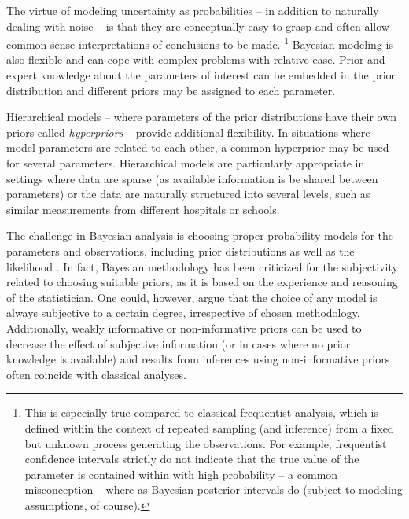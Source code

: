 The virtue of modeling uncertainty as probabilities -- in addition to
naturally dealing with noise -- is that they are conceptually easy to grasp
and often allow common-sense interpretations of conclusions to be made.
\footnote{This is especially true compared to classical frequentist analysis,
which is defined within the context of repeated sampling (and inference) from
a fixed but unknown process generating the observations. For
example, frequentist confidence intervals strictly do not indicate that the
true value of the parameter is contained within with high probability -- a
common misconception -- where as Bayesian posterior intervals do (subject to
modeling assumptions, of course).}
Bayesian modeling is also flexible and can cope with complex problems with
relative ease. Prior and expert knowledge about the parameters of interest can be
embedded in the prior distribution and different priors may be assigned to
each parameter.

Hierarchical models -- where parameters of the prior
distributions have their own priors called \emph{hyperpriors} -- provide
additional flexibility. In situations where model parameters are
related to each other, a common hyperprior may be used for several parameters.
Hierarchical models are particularly appropriate in settings where
data are sparse (as available information is be shared between parameters)
or the data are naturally structured into several levels, such as 
similar measurements from different hospitals or schools.

The challenge in Bayesian analysis is choosing proper probability models for
the parameters and observations, including prior distributions as well as the
likelihood \citep{Gelman2013}. In fact, Bayesian methodology has been
criticized for the subjectivity related to choosing suitable priors, as it is
based on the experience and reasoning of the statistician. One could, however,
argue that the choice of any model is always subjective to a certain degree,
irrespective of chosen methodology. Additionally, weakly informative or non-informative
priors can be used to decrease the effect of subjective information (or
in cases where no prior knowledge is available) and results from
inferences using non-informative priors often coincide with classical
analyses.



